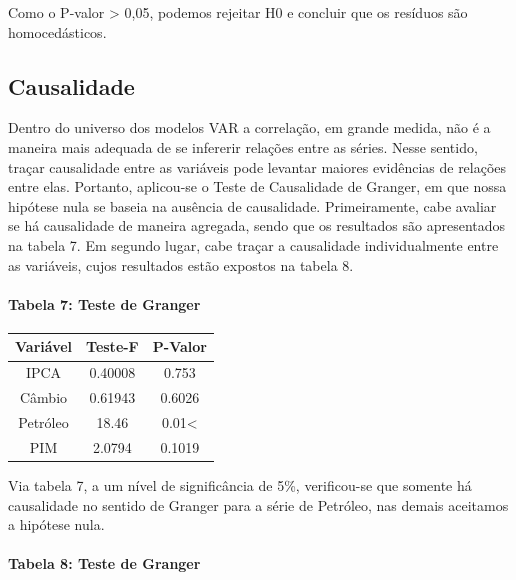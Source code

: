 \documentclass[12pt]{article}
\begin{document}
Como o P-valor \textgreater{} 0,05, podemos rejeitar H0 e concluir que
os resíduos são homocedásticos.

\hypertarget{causalidade}{%
\subsection{Causalidade}\label{causalidade}}

Dentro do universo dos modelos VAR a correlação, em grande medida, não é
a maneira mais adequada de se infererir relações entre as séries. Nesse
sentido, traçar causalidade entre as variáveis pode levantar maiores
evidências de relações entre elas. Portanto, aplicou-se o Teste de
Causalidade de Granger, em que nossa hipótese nula se baseia na ausência
de causalidade. Primeiramente, cabe avaliar se há causalidade de maneira
agregada, sendo que os resultados são apresentados na tabela 7. Em
segundo lugar, cabe traçar a causalidade individualmente entre as
variáveis, cujos resultados estão expostos na tabela 8.

\hypertarget{tabela-7-teste-de-granger}{%
\paragraph{Tabela 7: Teste de Granger}\label{tabela-7-teste-de-granger}}

\begin{longtable}[]{@{}ccc@{}}
\toprule
Variável & Teste-F & P-Valor \\
\midrule
\endhead
IPCA & 0.40008 & 0.753 \\
Câmbio & 0.61943 & 0.6026 \\
Petróleo & 18.46 & 0.01\textless{} \\
PIM & 2.0794 & 0.1019 \\
\bottomrule
\end{longtable}

Via tabela 7, a um nível de significância de 5\%, verificou-se que
somente há causalidade no sentido de Granger para a série de Petróleo,
nas demais aceitamos a hipótese nula.

\hypertarget{tabela-8-teste-de-granger}{%
\paragraph{Tabela 8: Teste de Granger}\label{tabela-8-teste-de-granger}}
\end{document}
